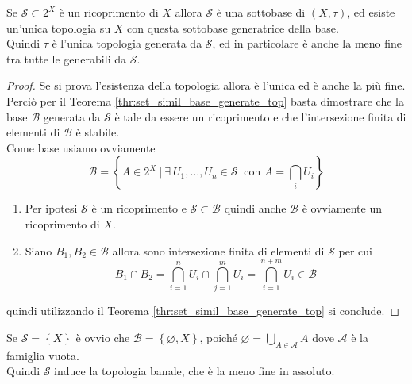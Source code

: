 \begin{proposition}
	Se $\mathcal{S} \subset 2^X$ è un ricoprimento di $X$ allora $\mathcal{S}$ è una sottobase di $(X,\tau)$, ed esiste un'unica topologia su $X$ con questa sottobase generatrice della base. \\ Quindi $\tau$ è l'unica topologia generata da $\mathcal{S}$, ed in particolare è anche la meno fine tra tutte le generabili da $\mathcal{S}$.
\end{proposition}
\begin{proof}
	Se si prova l'esistenza della topologia allora è l'unica ed è anche la più fine.
	Perciò per il Teorema \ref{thr:set_simil_base_generate_top} basta dimostrare che la base $\mathcal{B}$ generata da $\mathcal{S}$ è tale da essere un ricoprimento e che l'intersezione finita di elementi di $\mathcal{B}$ è stabile.\\
	Come base usiamo ovviamente
	\begin{equation*}
	\mathcal{B} = \left\{ A \in 2^X \ \Big|\ \exists \ U_1, \dots, U_n \in \mathcal{S} \ \text{ con } A = \bigcap_{i } U_i \right\}
	\end{equation*}
	\begin{enumerate}
		\item Per ipotesi $\mathcal{S}$ è un ricoprimento e $\mathcal{S} \subset \mathcal{B}$ quindi anche $\mathcal{B}$ è ovviamente un ricoprimento di $X$.
		\item Siano $B_1, B_2 \in \mathcal{B}$ allora sono intersezione finita di elementi di $\mathcal{S}$ per cui
		\begin{equation*}
			B_1 \cap B_2 = \bigcap^n_{i=1} U_i \cap \bigcap^{m}_{j=1} U_i = \bigcap^{n+m}_{i=1} U_i  \in \mathcal{B}
		\end{equation*}
	\end{enumerate}
	quindi utilizzando il Teorema \ref{thr:set_simil_base_generate_top} si conclude.
	\end{proof}

\begin{remark}
	Se $\mathcal{S} = \left\{X\right\}$ è ovvio che $\mathcal{B} = \left\{\varnothing, X\right\}$, poiché $\varnothing = \bigcup_{A \in \mathcal{A}} A $ dove $\mathcal{A}$ è la famiglia vuota. \\ Quindi $\mathcal{S}$ induce la topologia banale, che è la meno fine in assoluto.
\end{remark}


\newpage

